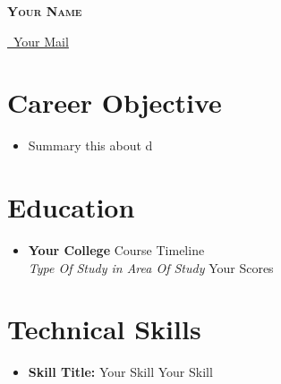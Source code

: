 \documentclass[letterpaper,5pt]{article}
\begin{document}
    
    \begin{center}
      \textbf{\Huge \scshape Your Name} \\ \vspace{5pt}
      
      \href{mailto:mail@mail.com}{\raisebox{-0.05\height}\faEnvelope \ Your Mail} 
       \
       \
       \
    \end{center}
    
      \section{Career Objective}
        \begin{itemize}[leftmargin=0.15in, label={}]
          \item{Summary this about d}
        \end{itemize}
    
    \section{Education}
      
        \begin{itemize}
        \item
            \textbf{Your College} \hfill Course Timeline \\
            \textit{Type Of Study in Area Of Study} \hfill Your Scores
        \end{itemize}
      
      

    
    \section{Technical Skills}
    
        \begin{itemize}[leftmargin=0.15in,label={}]
        \item{
          \textbf{Skill Title: }{\textbullet{} Your Skill \textbullet{} Your Skill \newline}
        }
        \end{itemize}
        \vspace*{-6mm}  
        
\end{document}
